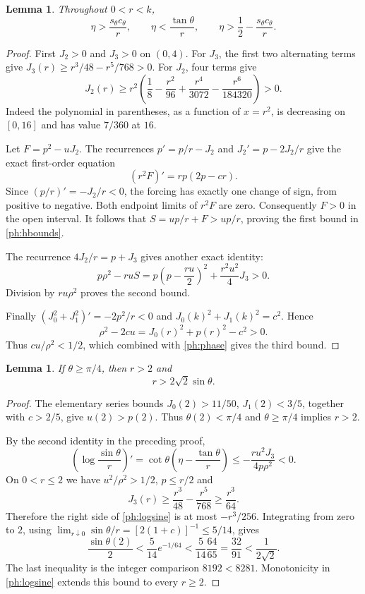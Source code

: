 \documentclass[11pt,letterpaper,reqno]{amsart}
\newtheorem{lemma}[theorem]{Lemma}
\theoremstyle{definition}
\begin{document}
\begin{lemma}\label{ph:diskbounds}
Throughout $0<r<k$,
\begin{equation}\label{ph:hbounds}
 \eta>\frac{s_\theta c_\theta}{r},\qquad \eta<\frac{\tan\theta}{r},\qquad
 \eta>\frac12-\frac{s_\theta c_\theta}{r}.
\end{equation}
\end{lemma}
\begin{proof}
First $J_2>0$ and $J_3>0$ on $(0,4)$. For $J_3$, the first two
alternating terms give $J_3(r)\ge r^3/48-r^5/768>0$.
For $J_2$, four terms give
\[
 J_2(r)\ge r^2\left(\frac18-\frac{r^2}{96}
                 +\frac{r^4}{3072}-\frac{r^6}{184320}\right)>0.
\]
Indeed the polynomial in parentheses, as a function of $x=r^2$,
is decreasing on $[0,16]$ and has value $7/360$ at $16$.

Let $F=p^2-uJ_2$. The recurrences $p'=p/r-J_2$ and
$J_2'=p-2J_2/r$ give the exact first-order equation
\[
 (r^2F)'=rp(2p-cr).
\]
Since $(p/r)'=-J_2/r<0$, the forcing has exactly one change of sign,
from positive to negative. Both endpoint limits of $r^2F$ are zero.
Consequently $F>0$ in the open interval. It follows that
$S=up/r+F>up/r$, proving the first bound in \eqref{ph:hbounds}.

The recurrence $4J_2/r=p+J_3$ gives another exact identity:
\[
 p \rho^2-ruS=p\left(p-\frac{ru}2\right)^2
                  +\frac{r^2u^2}{4}J_3>0.
\]
Division by $ru\rho^2$ proves the second bound.

Finally $(J_0^2+J_1^2)'=-2p^2/r<0$ and
$J_0(k)^2+J_1(k)^2=c^2$. Hence
\[
 \rho^2-2cu=J_0(r)^2+p(r)^2-c^2>0.
\]
Thus $cu/\rho^2<1/2$, which combined with \eqref{ph:phase} gives the
third bound.
\end{proof}

\begin{lemma}\label{ph:radius}
If $\theta\ge\pi/4$, then $r>2$ and
\[
 r>2\sqrt2\sin\theta.
\]
\end{lemma}
\begin{proof}
The elementary series bounds $J_0(2)>11/50$,
$J_1(2)<3/5$, together with $c>2/5$, give $u(2)>p(2)$.
Thus $\theta(2)<\pi/4$ and $\theta\ge\pi/4$ implies $r>2$.

By the second identity in the preceding proof,
\begin{equation}\label{ph:logsine}
 \left(\log\frac{\sin\theta}{r}\right)'
 =\cot\theta\left(\eta-\frac{\tan\theta}{r}\right)
 \le-\frac{ru^2J_3}{4p \rho^2}<0.
\end{equation}
On $0<r\le2$ we have $u^2/\rho^2>1/2$, $p\le r/2$ and
\[
 J_3(r)\ge\frac{r^3}{48}-\frac{r^5}{768}
          \ge\frac{r^3}{64}.
\]
Therefore the right side of \eqref{ph:logsine} is at most
$-r^3/256$. Integrating from zero to $2$, using
$\lim_{r\downarrow0}\sin\theta/r=[2(1+c)]^{-1}\le5/14$,
gives
\[
 \frac{\sin\theta(2)}2
 <\frac5{14}e^{-1/64}<\frac5{14}\frac{64}{65}
 =\frac{32}{91}<\frac1{2\sqrt2}.
\]
The last inequality is the integer comparison $8192<8281$.
Monotonicity in \eqref{ph:logsine} extends this bound to every $r\ge2$.
\end{proof}
\end{document}

